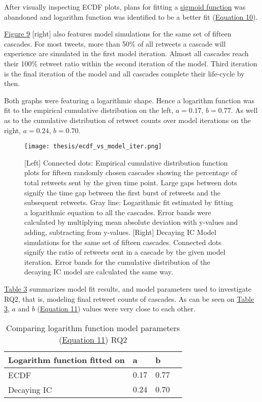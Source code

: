 \documentclass[11pt,a4paper]{article}
\begin{document}
    After visually inspecting ECDF plots, plans for fitting a \hyperlink{sec:sigmoid}{sigmoid function} was abandoned and logarithm function was identified to be a better fit (\hyperlink{eq:avrami}{Equation 10}). 
    
    \hyperlink{fig:ecdf-vs-iter}{Figure 9} [right] also features model simulations for the same set of fifteen cascades. For most tweets, more than 50\% of all retweets a cascade will experience are simulated in the first model iteration. Almost all cascades reach their 100\% retweet ratio within the second iteration of the model. Third iteration is the final iteration of the model and all cascades complete their life-cycle by then.

    Both graphs were featuring a logarithmic shape. Hence a logarithm function was fit to the empirical cumulative distribution on the left,  $a = 0.17$, $b =  0.77$. As well as to the cumulative distribution of retweet counts over model iterations on the right, $a = 0.24$, $b =  0.70$.

    \begin{figure}[H]
        \hypertarget{fig:ecdf-vs-iter}{}
        \centering
        \texttt{[image: thesis/ecdf\_vs\_model\_iter.png]}\\
        \caption{[Left] Connected dots: Empirical cumulative distribution function plots for fifteen randomly chosen cascades showing the percentage of total retweets sent by the given time point. Large gaps between dots signify the time gap between the first burst of retweets and the subsequent retweets. Gray line: Logarithmic fit estimated by fitting a logarithmic equation to all the cascades. Error bands were calculated by multiplying mean absolute deviation with y-values and  adding, subtracting from y-values. [Right] Decaying IC Model simulations for the same set of fifteen cascades. Connected dots signify the ratio of retweets sent in a cascade by the given model iteration. Error bands for the cumulative distribution of the decaying IC model are calculated the same way.} 
        \label{fig:enter-label}
    \end{figure}

    \hyperlink{tab:comp2}{Table 3} summarizes model fit results, and model parameters used to investigate RQ2, that is, modeling final retweet counts of cascades. As can be seen on \hyperlink{tab:comp}{Table 3}, $a$ and $b$ (\hyperlink{eq:log}{Equation 11}) values were very close to each other.

    \begin{table}[H]
        \hypertarget{tab:comp2}{}
      \centering
      \begin{tabular}{|l|l|l|l|}
        \hline
        \textbf{Logarithm function fitted on} & \textbf{a} & \textbf{b} \\
        \hline
        ECDF    & $0.17$ & $0.77$   \\
        Decaying IC & $0.24$ & $0.70$ \\
        \hline
      \end{tabular}
      \caption{Comparing logarithm function model parameters (\hyperlink{eq:log}{Equation 11}) RQ2}
      \label{tab:mytable}
    \end{table}
\end{document}

